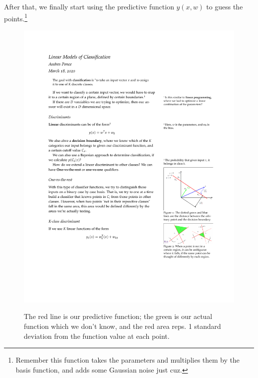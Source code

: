 \documentclass{tufte-handout}
\begin{document}
	After that, we finally start using the predictive function $y(x,w)$ to guess the points.\footnote{Remember
	this function takes the parameters and multiplies them by the basis function, and adds some Gaussian
	noise just cuz.}
	\begin{figure}[t]		
			\centering
			\includegraphics[width=\textwidth]{regression}\\
			\caption{The red line is our predictive function; the green is our actual function
				which we don't know, and the red area reps. 1 standard deviation from the function
				value at each point.}
	\end{figure}
\end{document}
